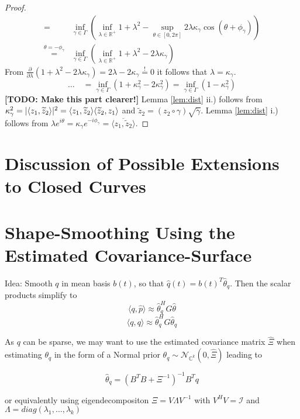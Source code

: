 \begin{proof}
\begin{align*}
     = &  \inf_{\gamma \in \Gamma} \left( \inf_{\lambda \in \mathbb{R}^+} 1 + \lambda^2  - \sup_{\theta \in [0,2\pi]} 2 \lambda \kappa_\gamma \cos{(\theta + \phi_\gamma)} \right) \\
     \overset{\theta = -\phi_\gamma}{=} & \inf_{\gamma \in \Gamma} \left( \inf_{\lambda \in \mathbb{R}^+} 1 + \lambda^2  - 2 \lambda \kappa_\gamma \right) 
  \end{align*}
  From $\frac{\partial}{\partial\lambda}\left( 1 + \lambda^2 - 2\lambda\kappa_\gamma \right) = 2\lambda - 2\kappa_\gamma \overset{!}{=} 0$ it follows that $\lambda = \kappa_\gamma$.
  $$\dots\quad = \inf_{\gamma \in \Gamma} \left( 1 + \kappa^2_\gamma  - 2 \kappa^2_\gamma \right) = \inf_{\gamma \in \Gamma} \left( 1 - \kappa^2_\gamma \right)$$
  \textbf{[TODO: Make this part clearer!]}
  Lemma \ref{lem:dist} ii.) follows from $\kappa^2_\gamma = \lvert\langle z_1, \widetilde z_2 \rangle\rvert^2 = \langle z_1, \widetilde z_2 \rangle \langle \widetilde z_2, z_1 \rangle$ and $\widetilde z_2 = (z_2 \circ \gamma) \sqrt{\dot\gamma}$.
  Lemma \ref{lem:dist} i.) follows from $\lambda e^{i\theta} = \kappa_\gamma e^{-i\phi_\gamma} = \overline{\langle z_1, \widetilde z_2 \rangle}$.
\end{proof}


\section{Discussion of Possible Extensions to Closed Curves}
\label{app:a-closed}


\section{Shape-Smoothing Using the Estimated Covariance-Surface}
\label{app:a-smooth}
Idea: Smooth $q$ in mean basis $b(t)$, so that $\hat{q}(t) = b(t)^T \hat{\theta}_q$. Then the scalar products simplify to
$$ \langle q, \hat{p} \rangle \approx \hat{\theta}_q^H G \hat{\theta} $$
$$ \langle q, q \rangle \approx \hat{\theta}_q^H G \hat{\theta}_q $$

As $q$ can be sparse, we may want to use the estimated covariance matrix $\hat{\Xi}$ when estimating $\theta_q$ in the form of a Normal prior $\theta_q \sim \mathcal{N}_{\mathbb{C}^k}(0, \hat\Xi)$ leading to

$$ \hat\theta_q = (B^T B + \Xi^{-1})^{-1} B^T q $$

or equivalently using eigendecompositon $\Xi = V \Lambda V^{-1}$ with $V^H V = \mathcal{I}$ and $\Lambda = diag(\lambda_1, \dots, \lambda_k)$

